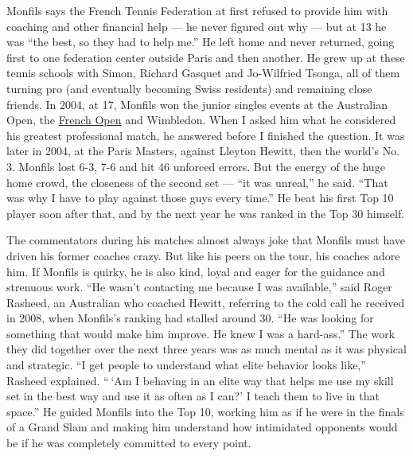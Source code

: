 Monfils says the French Tennis Federation at first refused to provide
him with coaching and other financial help --- he never figured out why
--- but at 13 he was ``the best, so they had to help me.'' He left home
and never returned, going first to one federation center outside Paris
and then another. He grew up at these tennis schools with Simon, Richard
Gasquet and Jo-Wilfried Tsonga, all of them turning pro (and eventually
becoming Swiss residents) and remaining close friends. In 2004, at 17,
Monfils won the junior singles events at the Australian Open, the
\href{http://topics.nytimes3xbfgragh.onion/topics/reference/timestopics/subjects/f/french_open_tennis/index.html?inline=nyt-classifier}{French
Open} and Wimbledon. When I asked him what he considered his greatest
professional match, he answered before I finished the question. It was
later in 2004, at the Paris Masters, against Lleyton Hewitt, then the
world's No. 3. Monfils lost 6-3, 7-6 and hit 46 unforced errors. But the
energy of the huge home crowd, the closeness of the second set --- ``it
was unreal,'' he said. ``That was why I have to play against those guys
every time.'' He beat his first Top 10 player soon after that, and by
the next year he was ranked in the Top 30 himself.

The commentators during his matches almost always joke that Monfils must
have driven his former coaches crazy. But like his peers on the tour,
his coaches adore him. If Monfils is quirky, he is also kind, loyal and
eager for the guidance and strenuous work. ``He wasn't contacting me
because I was available,'' said Roger Rasheed, an Australian who coached
Hewitt, referring to the cold call he received in 2008, when Monfils's
ranking had stalled around 30. ``He was looking for something that would
make him improve. He knew I was a hard-ass.'' The work they did together
over the next three years was as much mental as it was physical and
strategic. ``I get people to understand what elite behavior looks
like,'' Rasheed explained. `` `Am I behaving in an elite way that helps
me use my skill set in the best way and use it as often as I can?' I
teach them to live in that space.'' He guided Monfils into the Top 10,
working him as if he were in the finals of a Grand Slam and making him
understand how intimidated opponents would be if he was completely
committed to every point.

